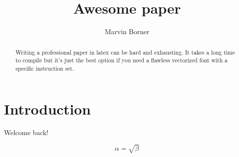 \documentclass{article}
\begin{document}
\title{Awesome paper}
\author{Marvin Borner}

\maketitle

\begin{abstract}
Writing a professional paper in latex can be hard and exhausting. It takes a long time to compile but it's just the best option if you need a flawless vectorized font with a specific instruction set.
\end{abstract}

\section{Introduction}
Welcome back!

\begin{equation}
    \label{simple_equation}
    \alpha = \sqrt{\beta}
\end{equation}
\end{document}

